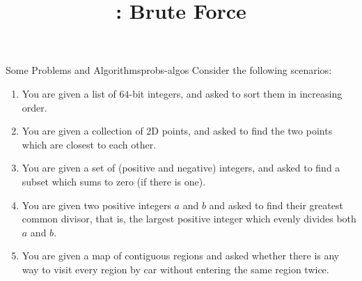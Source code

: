 \documentclass{tufte-handout}
\title{\thecourse: Brute Force}
\date{}
\begin{document}
\maketitle

\begin{model}{Some Problems and Algorithms}{probs-algos}
Consider the following scenarios:

\begin{enumerate}[label=(\alph*)]
\item You are given a list of $64$-bit integers, and asked to sort
  them in increasing order.
\item You are given a collection of 2D points, and asked to find the
  two points which are closest to each other.
\item You are given a set of (positive and negative)
  integers, and asked to find a subset which sums to zero (if there is
  one).
\item You are given two positive integers $a$ and $b$ and asked to
  find their greatest common divisor, that is, the largest positive
  integer which evenly divides both $a$ and $b$.
\item You are given a map of contiguous regions and asked whether
  there is any way to visit every region by car without entering the
  same region twice.
\end{enumerate}


\end{model}
\end{document}
